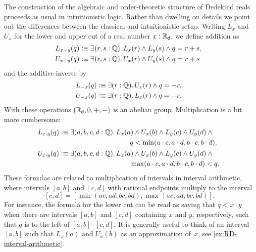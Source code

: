 The construction of the algebraic and order-theoretic structure of Dedekind reals proceeds
as usual in intuitionistic logic. Rather than dwelling on details we point out the
differences between the classical and intuitionistic setup. Writing $L_x$ and $U_x$ for
the lower and upper cut of a real number $x : \mathbb{R}_\mathsf{d}$, we define addition as%
%
%
\begin{align*}
  L_{x + y}(q) &\defeq \exis{r, s : \Q} L_x(r) \land L_y(s) \land q = r + s, \\
  U_{x + y}(q) &\defeq \exis{r, s : \Q} U_x(r) \land U_y(s) \land q = r + s
\end{align*}
%
and the additive inverse by
%
\begin{align*}
  L_{-x}(q) &\defeq \exis{r : \Q} U_x(r) \land q = - r, \\
  U_{-x}(q) &\defeq \exis{r : \Q} L_x(r) \land q = - r.
\end{align*}
%
With these operations $(\mathbb{R}_\mathsf{d}, 0, {+}, {-})$ is an abelian group. Multiplication is a bit
more cumbersome:
%
%
\begin{align*}
  L_{x \cdot y}(q) &\defeq
  \begin{aligned}[t]
    \exis{a, b, c, d : \Q} & L_x(a) \land U_x(b) \land L_y(c) \land U_y(d) \land {}\\
                           & \qquad q < \min (a \cdot c, a \cdot d, b \cdot c, b \cdot d),
  \end{aligned} \\
  U_{x \cdot y}(q) &\defeq
  \begin{aligned}[t]
    \exis{a, b, c, d : \Q} & L_x(a) \land U_x(b) \land L_y(c) \land U_y(d) \land {}\\
                           & \qquad \max (a \cdot c, a \cdot d, b \cdot c, b \cdot d) < q.
  \end{aligned}
\end{align*}
%
%
These formulas are related to multiplication of intervals in interval arithmetic, where
intervals $[a,b]$ and $[c,d]$ with rational endpoints multiply to the interval
%
\begin{equation*}
  [a,b] \cdot [c,d] =
  [\min(a c, a d, b c, b d), \max(a c, a d, b c, b d)].
\end{equation*}
%
For instance, the formula for the lower cut can be read as saying that $q < x \cdot y$
when there are intervals $[a,b]$ and $[c,d]$ containing $x$ and $y$, respectively, such
that $q$ is to the left of $[a,b] \cdot [c,d]$. It is generally useful to think of an
interval $[a,b]$ such that $L_x(a)$ and $U_x(b)$ as an approximation of~$x$, see
\autoref{ex:RD-interval-arithmetic}.

